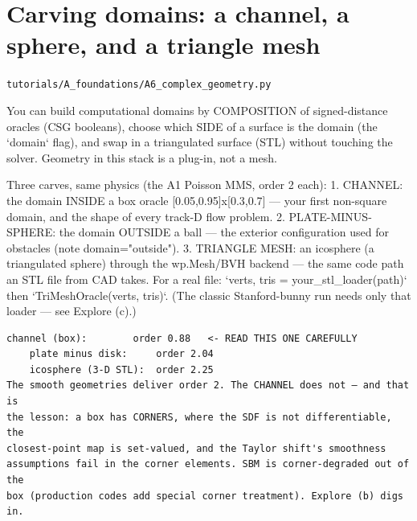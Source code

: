 \chapter{Carving domains: a channel, a sphere, and a triangle mesh}
\label{ch:A6_complex_geometry}
\noindent\texttt{tutorials/A\_foundations/A6\_complex\_geometry.py}\\[0.75em]
\begin{outcome}
You can build computational domains by COMPOSITION of
signed-distance oracles (CSG booleans), choose which SIDE of a surface is
the domain (the `domain` flag), and swap in a triangulated surface (STL)
without touching the solver. Geometry in this stack is a plug-in, not a
mesh.
\end{outcome}

Three carves, same physics (the A1 Poisson MMS, order 2 each):
 1. CHANNEL: the domain INSIDE a box oracle [0.05,0.95]x[0.3,0.7] — your
    first non-square domain, and the shape of every track-D flow problem.
 2. PLATE-MINUS-SPHERE: the domain OUTSIDE a ball — the exterior
    configuration used for obstacles (note domain="outside").
 3. TRIANGLE MESH: an icosphere (a triangulated sphere) through the
    wp.Mesh/BVH backend — the same code path an STL file from CAD takes.
    For a real file: `verts, tris = your\_stl\_loader(path)` then
    `TriMeshOracle(verts, tris)`. (The classic Stanford-bunny run needs
    only that loader — see Explore (c).)

\begin{expected}
\begin{verbatim}
channel (box):        order 0.88   <- READ THIS ONE CAREFULLY
    plate minus disk:     order 2.04
    icosphere (3-D STL):  order 2.25
The smooth geometries deliver order 2. The CHANNEL does not — and that is
the lesson: a box has CORNERS, where the SDF is not differentiable, the
closest-point map is set-valued, and the Taylor shift's smoothness
assumptions fail in the corner elements. SBM is corner-degraded out of the
box (production codes add special corner treatment). Explore (b) digs in.
\end{verbatim}
\end{expected}

